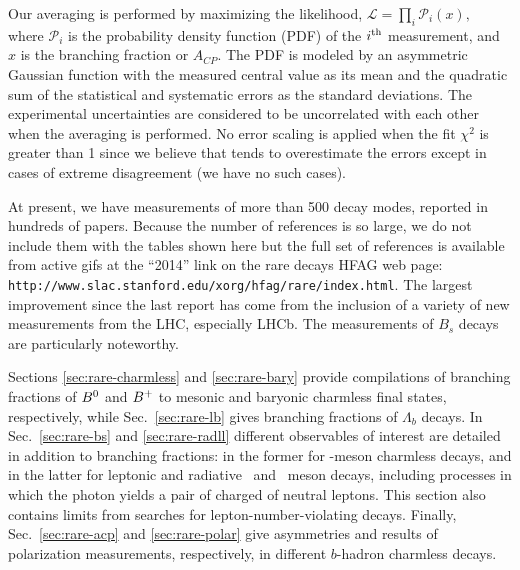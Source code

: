 Our averaging is performed by maximizing the likelihood,
   $\displaystyle {\mathcal L} = \prod_i {\mathcal P}_i(x),$  
where ${\mathcal P_i}$ is the probability density function (PDF) of the
$i^{\rm th}$  measurement, and $x$ is the branching fraction or $A_{CP}$.
The PDF is modeled by an asymmetric Gaussian function with the measured
central value as its mean and the quadratic sum of the statistical
and systematic errors as the standard deviations. The experimental
uncertainties are considered to be uncorrelated with each other when the 
averaging is performed. No error scaling is applied when the fit $\chi^2$ is 
greater than 1 since we believe that tends to overestimate the errors
except in cases of extreme disagreement (we have no such cases).

At present, we have measurements of more than 500 decay modes, reported in
hundreds of 
papers. Because the number of references is so large, we do
not include them with the tables shown here but the full set of
references is available from active gifs at the 
``2014'' link on 
the rare decays HFAG web page: {\tt http://www.slac.stanford.edu/xorg/hfag/rare/index.html}.
The largest improvement since the last report has come from the inclusion of a
variety of new measurements from the LHC, especially LHCb.  The
measurements of $B_s$ decays are particularly noteworthy.

Sections \ref{sec:rare-charmless} and \ref{sec:rare-bary} provide compilations of branching fractions of $B^0$ and $B^{+}$ to mesonic and baryonic charmless final states, respectively, 
while Sec.~\ref{sec:rare-lb} gives branching fractions of $\Lambda_b$ decays.
In Sec.~\ref{sec:rare-bs} and \ref{sec:rare-radll} different observables of interest are detailed in addition to branching fractions: in the former for \Bs-meson charmless decays, and in the latter for leptonic and radiative \Bz\ and \Bp\ meson decays, including processes in which the photon yields a pair of charged of neutral leptons. This section also contains limits from searches for lepton-number-violating decays.
Finally, Sec.~\ref{sec:rare-acp} and \ref{sec:rare-polar} give \CP asymmetries and results of polarization measurements, respectively, in different $b$-hadron charmless decays.



